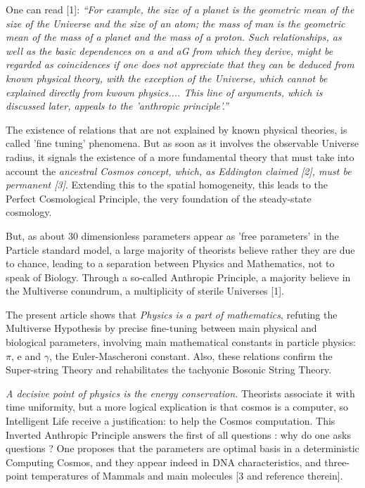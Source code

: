 \documentclass[twoside,draft]{article}
\begin{document}
{One can read [1]: \textit{“For example, the size of a planet is the geometric mean of the size of the Universe and the size of an atom; the mass of man is the geometric mean of the mass of a planet and the mass of a proton. Such relationships, as well as the basic dependences on a and aG from which they derive, might be regarded as coincidences if one does not appreciate that they can be deduced from known physical theory, with the exception of the Universe, which cannot be explained directly from kwown physics.... This line of arguments, which is discussed later, appeals to the 'anthropic principle'.”}

The existence of relations that are not explained by known physical theories, is called 'fine tuning' phenomena. But as soon as it involves the observable Universe radius, it signals the existence of a more fundamental theory that must take into account the \textit{ancestral Cosmos concept, which, as Eddington claimed [2], must be permanent [3]}. Extending this to the spatial homogeneity, this leads to the Perfect Cosmological Principle, the very foundation of the steady-state cosmology.

But, as about 30 dimensionless parameters appear as 'free parameters' in the Particle standard model, a large majority of theorists believe rather they are due to chance, leading to a separation between Physics and Mathematics, not to speak of Biology. Through a so-called Anthropic Principle, a majority believe in the Multiverse conundrum, a multiplicity of sterile Universes [1].

The present article shows that \textit{Physics is a part of mathematics}, refuting the Multiverse Hypothesis by precise fine-tuning between main physical and biological parameters, involving main mathematical constants in particle physics: $\pi$,  e and $\gamma$, the Euler-Mascheroni constant. Also, these relations confirm the Super-string Theory and rehabilitates the tachyonic Bosonic String Theory.

\textit{A decisive point of physics is the energy conservation.} Theorists associate it with time uniformity, but a more logical explication is that cosmos is a computer, so Intelligent Life receive a justification: to help the Cosmos computation. This Inverted Anthropic Principle answers the first of all questions : why do one asks questions ? One proposes that the parameters are optimal basis in a deterministic Computing Cosmos, and they appear indeed in DNA characteristics, and three-point temperatures of Mammals and main molecules [3 and reference therein].

}
\end{document}
